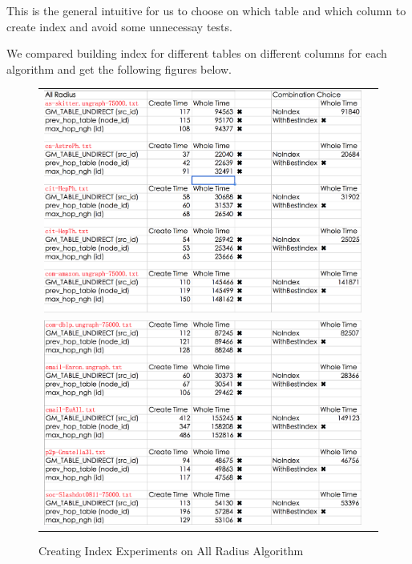 This is the general intuitive for us to choose on which table and which column to create index and avoid some unnecessay tests.

We compared building index for different tables on different columns for each algorithm and get the following figures below. 

\begin{figure}[H]
\begin{center}
\begin{tabular}{cc}
     \includegraphics[width=1.0\textwidth]{FIG/AllRadius1.png} \\
     \includegraphics[width=1.0\textwidth]{FIG/AllRadius2.png} \\
\end{tabular}
\caption{Creating Index Experiments on All Radius Algorithm}
\end{center}
\end{figure}

